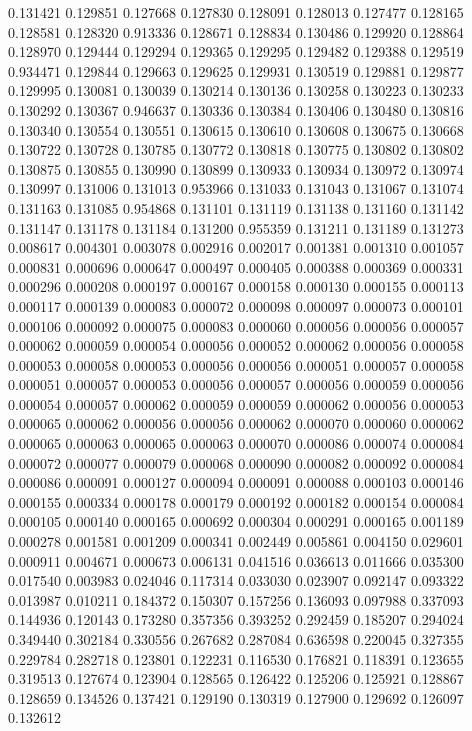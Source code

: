 0.131421
0.129851
0.127668
0.127830
0.128091
0.128013
0.127477
0.128165
0.128581
0.128320
0.913336
0.128671
0.128834
0.130486
0.129920
0.128864
0.128970
0.129444
0.129294
0.129365
0.129295
0.129482
0.129388
0.129519
0.934471
0.129844
0.129663
0.129625
0.129931
0.130519
0.129881
0.129877
0.129995
0.130081
0.130039
0.130214
0.130136
0.130258
0.130223
0.130233
0.130292
0.130367
0.946637
0.130336
0.130384
0.130406
0.130480
0.130816
0.130340
0.130554
0.130551
0.130615
0.130610
0.130608
0.130675
0.130668
0.130722
0.130728
0.130785
0.130772
0.130818
0.130775
0.130802
0.130802
0.130875
0.130855
0.130990
0.130899
0.130933
0.130934
0.130972
0.130974
0.130997
0.131006
0.131013
0.953966
0.131033
0.131043
0.131067
0.131074
0.131163
0.131085
0.954868
0.131101
0.131119
0.131138
0.131160
0.131142
0.131147
0.131178
0.131184
0.131200
0.955359
0.131211
0.131189
0.131273
0.008617
0.004301
0.003078
0.002916
0.002017
0.001381
0.001310
0.001057
0.000831
0.000696
0.000647
0.000497
0.000405
0.000388
0.000369
0.000331
0.000296
0.000208
0.000197
0.000167
0.000158
0.000130
0.000155
0.000113
0.000117
0.000139
0.000083
0.000072
0.000098
0.000097
0.000073
0.000101
0.000106
0.000092
0.000075
0.000083
0.000060
0.000056
0.000056
0.000057
0.000062
0.000059
0.000054
0.000056
0.000052
0.000062
0.000056
0.000058
0.000053
0.000058
0.000053
0.000056
0.000056
0.000051
0.000057
0.000058
0.000051
0.000057
0.000053
0.000056
0.000057
0.000056
0.000059
0.000056
0.000054
0.000057
0.000062
0.000059
0.000059
0.000062
0.000056
0.000053
0.000065
0.000062
0.000056
0.000056
0.000062
0.000070
0.000060
0.000062
0.000065
0.000063
0.000065
0.000063
0.000070
0.000086
0.000074
0.000084
0.000072
0.000077
0.000079
0.000068
0.000090
0.000082
0.000092
0.000084
0.000086
0.000091
0.000127
0.000094
0.000091
0.000088
0.000103
0.000146
0.000155
0.000334
0.000178
0.000179
0.000192
0.000182
0.000154
0.000084
0.000105
0.000140
0.000165
0.000692
0.000304
0.000291
0.000165
0.001189
0.000278
0.001581
0.001209
0.000341
0.002449
0.005861
0.004150
0.029601
0.000911
0.004671
0.000673
0.006131
0.041516
0.036613
0.011666
0.035300
0.017540
0.003983
0.024046
0.117314
0.033030
0.023907
0.092147
0.093322
0.013987
0.010211
0.184372
0.150307
0.157256
0.136093
0.097988
0.337093
0.144936
0.120143
0.173280
0.357356
0.393252
0.292459
0.185207
0.294024
0.349440
0.302184
0.330556
0.267682
0.287084
0.636598
0.220045
0.327355
0.229784
0.282718
0.123801
0.122231
0.116530
0.176821
0.118391
0.123655
0.319513
0.127674
0.123904
0.128565
0.126422
0.125206
0.125921
0.128867
0.128659
0.134526
0.137421
0.129190
0.130319
0.127900
0.129692
0.126097
0.132612
